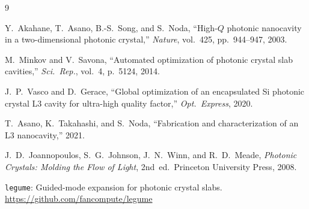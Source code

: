 \documentclass[11pt,a4paper]{article}
\begin{document}
\begin{thebibliography}{9}

  Y.~Akahane, T.~Asano, B.-S.~Song, and S.~Noda,
  ``High-$Q$ photonic nanocavity in a two-dimensional photonic crystal,''
  \emph{Nature}, vol.~425, pp.~944--947, 2003.

  M.~Minkov and V.~Savona,
  ``Automated optimization of photonic crystal slab cavities,''
  \emph{Sci.\ Rep.}, vol.~4, p.~5124, 2014.

  J.~P.~Vasco and D.~Gerace,
  ``Global optimization of an encapsulated Si photonic crystal L3 cavity for ultra-high quality factor,''
  \emph{Opt.\ Express}, 2020.

  T.~Asano, K.~Takahashi, and S.~Noda,
  ``Fabrication and characterization of an L3 nanocavity,''
  2021.

  J.~D.~Joannopoulos, S.~G.~Johnson, J.~N.~Winn, and R.~D.~Meade,
  \emph{Photonic Crystals: Molding the Flow of Light},
  2nd~ed.\ Princeton University Press, 2008.

  \texttt{legume}: Guided-mode expansion for photonic crystal slabs.
  \url{https://github.com/fancompute/legume}

\end{thebibliography}
\end{document}
